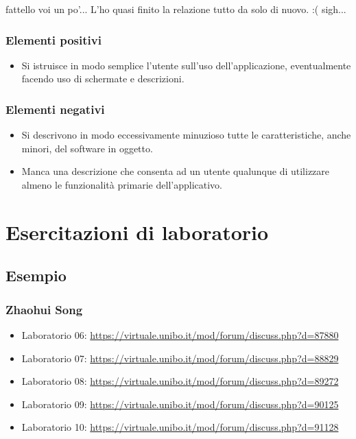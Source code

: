 \documentclass[a4paper,12pt]{report}
\begin{document}
fattello voi un po'... L'ho quasi finito la relazione tutto da solo di nuovo. :( sigh...

\subsection*{Elementi positivi}

\begin{itemize}
 \item Si istruisce in modo semplice l'utente sull'uso dell'applicazione, eventualmente facendo uso di schermate e descrizioni.
\end{itemize}

\subsection*{Elementi negativi}
\begin{itemize}
 \item Si descrivono in modo eccessivamente minuzioso tutte le caratteristiche, anche minori, del software in oggetto.
 \item Manca una descrizione che consenta ad un utente qualunque di utilizzare almeno le funzionalità primarie dell'applicativo.
\end{itemize}

\chapter{Esercitazioni di laboratorio}


\section*{Esempio}

\subsection{Zhaohui Song}

\begin{itemize}
 \item Laboratorio 06: \url{https://virtuale.unibo.it/mod/forum/discuss.php?d=87880}
 \item Laboratorio 07: \url{https://virtuale.unibo.it/mod/forum/discuss.php?d=88829}
 \item Laboratorio 08: \url{https://virtuale.unibo.it/mod/forum/discuss.php?d=89272}
 \item Laboratorio 09: \url{https://virtuale.unibo.it/mod/forum/discuss.php?d=90125}
 \item Laboratorio 10: \url{https://virtuale.unibo.it/mod/forum/discuss.php?d=91128}

\end{itemize}




\end{document}
